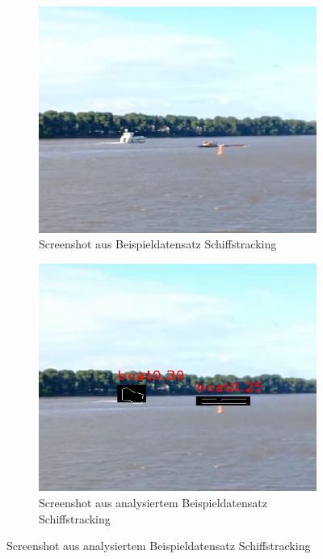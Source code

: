 {	\begin{figure}[ht]
		\centering
		\begin{subfigure}[b]{0.45\textwidth}
			\includegraphics[width=\textwidth]{images/Evaluation/shiptracking_raw.png}
			\caption{Screenshot aus Beispieldatensatz Schiffstracking}
		\end{subfigure} \hfill
		\begin{subfigure}[b]{0.45\textwidth}
			\includegraphics[width=\textwidth]{images/Evaluation/shiptracking_analyzed.png}
			\caption{Screenshot aus analysiertem Beispieldatensatz Schiffstracking}

\end{subfigure}
\end{figure}}
